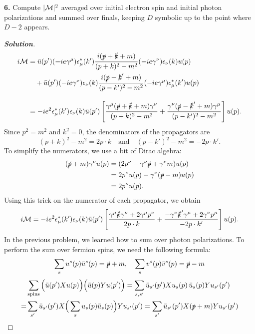 \documentclass[11pt]{article}
\newenvironment{solution}[1][]{\begin{proof}[\textbf{Solution}]}{\end{proof}}
\begin{document}
\begin{tcolorbox}[problem]
\textbf{6.} Compute $|{\cal M}|^2$ averaged over initial electron spin and initial photon polarizations and summed over finals, keeping $D$ symbolic up to the point where $D-2$ appears.
\end{tcolorbox}
\begin{solution}[14.6]
	\[
\begin{aligned}
	i\mathcal{M} &= \bar{u}(p')(-ie\gamma^\mu)\epsilon^*_\mu(k') \frac{i(\slashed{p} + \slashed{k} + m)}{(p+k)^2 - m^2} (-ie\gamma^\nu)\epsilon_\nu(k)u(p) \\
	&\quad + \bar{u}(p')(-ie\gamma^\nu)\epsilon_\nu(k) \frac{i(\slashed{p} - \slashed{k}' + m)}{(p-k')^2 - m^2} (-ie\gamma^\mu)\epsilon^*_\mu(k')u(p) \\[10pt]
	&= -ie^2 \epsilon^*_\mu(k') \epsilon_\nu(k) \bar{u}(p') \left[ \frac{\gamma^\mu (\slashed{p} + \slashed{k} + m) \gamma^\nu}{(p+k)^2 - m^2} + \frac{\gamma^\nu (\slashed{p} - \slashed{k}' + m) \gamma^\mu}{(p-k')^2 - m^2} \right] u(p).
\end{aligned}
\]
 Since $p^2 = m^2$ and $k^2 = 0$, the denominators of the propagators are
\[
(p+k)^2 - m^2 = 2p \cdot k \quad \text{and} \quad (p-k')^2 - m^2 = -2p \cdot k'.
\]
To simplify the numerators, we use a bit of Dirac algebra:
\begin{align*}
	(\slashed{p} + m)\gamma^\nu u(p) &= (2p^\nu - \gamma^\nu \slashed{p} + \gamma^\nu m)u(p) \\
	&= 2p^\nu u(p) - \gamma^\nu (\slashed{p} - m)u(p) \\
	&= 2p^\nu u(p).
\end{align*}
Using this trick on the numerator of each propagator, we obtain
\begin{equation*}
	i\mathcal{M} = -ie^2 \epsilon_\mu^*(k') \epsilon_\nu(k) \bar{u}(p') \left[ \frac{\gamma^\mu \slashed{k} \gamma^\nu + 2\gamma^\mu p^\nu}{2p \cdot k} + \frac{-\gamma^\nu \slashed{k}' \gamma^\mu + 2\gamma^\nu p^\mu}{-2p \cdot k'} \right] u(p). 
\end{equation*}
In the previous problem, we learned how to sum over photon polarizations. To perform the sum over fermion spins, we need the following formula:
\[
\sum_su^s(p)\bar{u}^s(p)=\slashed{p}+m,\quad\sum_sv^s(p)\bar{v}^s(p)=\slashed{p}-m
\]
\[
\begin{aligned}
	&\sum_{\text{spins}}\Big(\bar u(p')X u(p)\Big)\Big(\bar u(p)Y u(p')\Big)
	=\sum_{s,s'}\bar u_{s'}(p')X u_s(p)\,\bar u_s(p)Y u_{s'}(p')\\
	=&\sum_{s'}\bar u_{s'}(p')X\Big(\sum_s u_s(p)\bar u_s(p)\Big)Y u_{s'}(p')=\sum_{s'}\bar u_{s'}(p')X(\slashed p+m)Y u_{s'}(p')\\

\end{aligned}\]
\end{solution}
\end{document}
